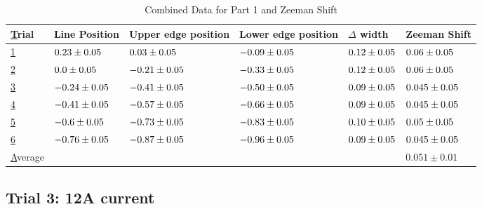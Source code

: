 \begin{table}
    \begin{adjustwidth}{-100pt}{-100pt}
        \centering
        \begin{tabular}{|l|l|l|l|l|l|}
            \hline
            {\ul Trial}   & Line Position                & Upper edge position          & Lower edge position          & $\Delta$ width              & Zeeman Shift                 \\ \hline
            {\ul 1}       & $0.23 \pm 0.05$  & $0.03 \pm 0.05$  & $-0.09 \pm 0.05$ & $0.12 \pm 0.05$ & $0.06 \pm 0.05$  \\ \hline
            {\ul 2}       & $0.0 \pm 0.05$   & $-0.21 \pm 0.05$ & $-0.33 \pm 0.05$ & $0.12 \pm 0.05$ & $0.06 \pm 0.05$  \\ \hline
            {\ul 3}       & $-0.24 \pm 0.05$ & $-0.41 \pm 0.05$ & $-0.50 \pm 0.05$ & $0.09 \pm 0.05$ & $0.045 \pm 0.05$ \\ \hline
            {\ul 4}       & $-0.41 \pm 0.05$ & $-0.57 \pm 0.05$ & $-0.66 \pm 0.05$ & $0.09 \pm 0.05$ & $0.045 \pm 0.05$ \\ \hline
            {\ul 5}       & $-0.6 \pm 0.05$  & $-0.73 \pm 0.05$ & $-0.83 \pm 0.05$ & $0.10 \pm 0.05$ & $0.05 \pm 0.05$  \\ \hline
            {\ul 6}       & $-0.76 \pm 0.05$ & $-0.87 \pm 0.05$ & $-0.96 \pm 0.05$ & $0.09 \pm 0.05$ & $0.045 \pm 0.05$ \\ \hline
            {\ul Average} &                              &                              &                              &                             & $0.051 \pm 0.01$             \\ \hline
        \end{tabular}
    \end{adjustwidth}
    \caption{Combined Data for Part 1 and Zeeman Shift}
\end{table}


\subsection{Trial 3: 12A current}

